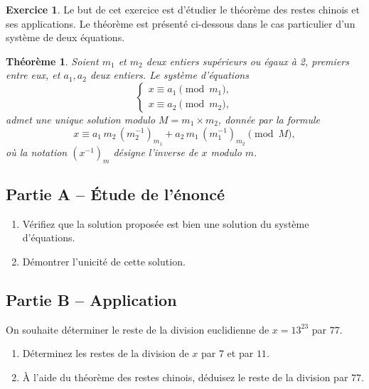 \documentclass{article}
\newtheorem*{theorem*}{Théorème}
\theoremstyle{definition}
\newtheorem{exercice}{Exercice}
\begin{document}
\begin{exercice}
  Le but de cet exercice est d'étudier le théorème des restes chinois et ses applications. Le théorème est présenté ci-dessous dans le cas particulier d'un système de deux équations.
  \begin{theorem*}
    Soient \(m_1\) et \(m_2\) deux entiers supérieurs ou égaux à 2, premiers entre eux, et \(a_1, a_2\) deux entiers. Le système d'équations
    \[
    \begin{cases}
    x \equiv a_1 \pmod{m_1}, \\
    x \equiv a_2 \pmod{m_2},
    \end{cases}
    \]
    admet une unique solution modulo \(M = m_1 \times m_2\), donnée par la formule
    \[
    x \equiv a_1\, m_2\, (m_2^{-1})_{m_1} + a_2\, m_1\, (m_1^{-1})_{m_2}\pmod{M},
    \]
    où la notation \((x^{-1})_m\) désigne l'inverse de \(x\) modulo \(m\).
  \end{theorem*}
  
  \subsection*{Partie A -- Étude de l'énoncé}
  \begin{enumerate}
    \item Vérifiez que la solution proposée est bien une solution du système d'équations.
    \item Démontrer l'unicité de cette solution.
  \end{enumerate}
  
  \subsection*{Partie B -- Application}
  On souhaite déterminer le reste de la division euclidienne de \(x = 13^{23}\) par \(77\).
  \begin{enumerate}
    \item Déterminez les restes de la division de \(x\) par \(7\) et par \(11\).
    \item À l'aide du théorème des restes chinois, déduisez le reste de la division par \(77\).
  \end{enumerate}
  

\end{exercice}
\end{document}
